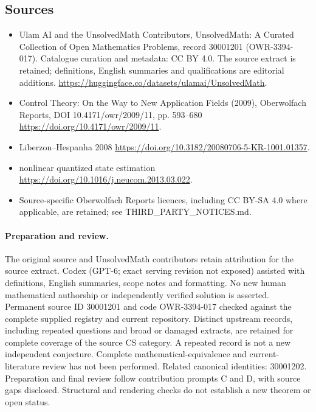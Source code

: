 \documentclass[11pt]{article}
\begin{document}
\subsection{Sources}
\begin{itemize}
\item[S1] Ulam AI and the UnsolvedMath Contributors, UnsolvedMath: A Curated Collection of Open Mathematics Problems, record 30001201 (OWR-3394-017). Catalogue curation and metadata: CC BY 4.0. The source extract is retained; definitions, English summaries and qualifications are editorial additions.
\url{https://huggingface.co/datasets/ulamai/UnsolvedMath}.
\item[S2] Control Theory: On the Way to New Application Fields (2009), Oberwolfach Reports, DOI 10.4171/owr/2009/11, pp. 593--680
\url{https://doi.org/10.4171/owr/2009/11}.
\item[S3] Liberzon--Hespanha 2008
\url{https://doi.org/10.3182/20080706-5-KR-1001.01357}.
\item[S4] nonlinear quantized state estimation
\url{https://doi.org/10.1016/j.neucom.2013.03.022}.
\item Source-specific Oberwolfach Reports licences, including CC BY-SA 4.0 where applicable, are retained; see THIRD\_PARTY\_NOTICES.md.
\end{itemize}
\paragraph{Preparation and review.}
The original source and UnsolvedMath contributors retain attribution for the source extract. Codex (GPT-6; exact serving revision not exposed) assisted with definitions, English summaries, scope notes and formatting. No new human mathematical authorship or independently verified solution is asserted. Permanent source ID 30001201 and code OWR-3394-017 checked against the complete supplied registry and current repository. Distinct upstream records, including repeated questions and broad or damaged extracts, are retained for complete coverage of the source CS category. A repeated record is not a new independent conjecture. Complete mathematical-equivalence and current-literature review has not been performed. Related canonical identities: 30001202. Preparation and final review follow contribution prompts C and D, with source gaps disclosed. Structural and rendering checks do not establish a new theorem or open status.
\label{end:30001201}
\end{document}
